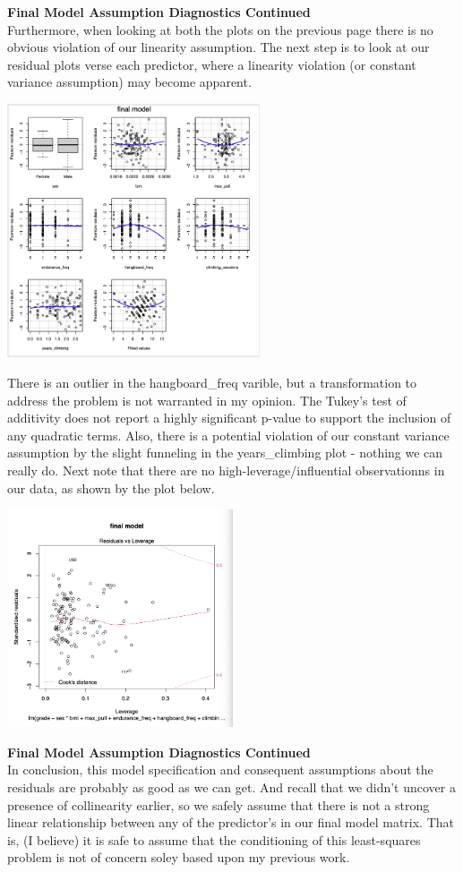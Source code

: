 \documentclass[11pt]{amsart}
\begin{document}
\newpage
{\bf\large Final Model Assumption Diagnostics Continued}\\
Furthermore, when looking at both the plots on the previous page there is no obvious violation of our linearity assumption.
The next step is to look at our residual plots verse each predictor, where a linearity violation (or constant variance assumption) may become apparent.\\

\begin{center}
\includegraphics[width=0.56\textwidth]{resid3}
\end{center}

There is an outlier in the hangboard\_freq varible, but a transformation to address the problem is not warranted in my opinion.
The Tukey's test of additivity does not report a highly significant p-value to support the inclusion of any quadratic terms. Also, there is a potential violation of our constant variance assumption by the slight funneling in the years\_climbing plot - nothing we can really do.
Next note that there are no high-leverage/influential observationns in our data, as shown by the plot below.
\begin{center}
\includegraphics[width=0.5\textwidth]{leverage}
\end{center}

\newpage
{\bf\large Final Model Assumption Diagnostics Continued}\\
In conclusion, this model specification and consequent assumptions about the residuals are probably as good as we can get.
And recall that we didn't uncover a presence of collinearity earlier, so we safely assume that there is not a strong linear relationship between any of the predictor's in our final model matrix.
That is, (I believe) it is safe to assume that the conditioning of this least-squares problem is not of concern soley based upon my previous work. 
\end{document}
